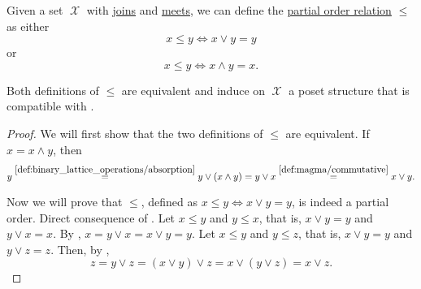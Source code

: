\begin{proposition}\label{thm:binary_lattice_operations_poset}
  Given a set \( \mscrX \) with \hyperref[def:binary_lattice_operations/join]{joins} and \hyperref[def:binary_lattice_operations/meet]{meets}, we can define the \hyperref[def:poset]{partial order relation} \( \leq \) as either
  \begin{equation*}
    x \leq y \iff x \vee y = y
  \end{equation*}
  or
  \begin{equation*}
    x \leq y \iff x \wedge y = x.
  \end{equation*}

  Both definitions of \( \leq \) are equivalent and induce on \( \mscrX \) a poset structure that is compatible with .
\end{proposition}
\begin{proof}
  We will first show that the two definitions of \( \leq \) are equivalent. If \( x = x \wedge y \), then
  \begin{equation*}
    y
    \overset {\ref{def:binary_lattice_operations/absorption}} =
    y \vee (x \wedge y)
    =
    y \vee x
    \overset {\ref{def:magma/commutative}} =
    x \vee y.
  \end{equation*}

  Now we will prove that \( \leq \), defined as \( x \leq y \iff x \vee y = y \), is indeed a partial order.
   Direct consequence of .
   Let \( x \leq y \) and \( y \leq x \), that is, \( x \vee y = y \) and \( y \vee x = x \). By , \( x = y \vee x = x \vee y = y \).
   Let \( x \leq y \) and \( y \leq z \), that is, \( x \vee y = y \) and \( y \vee z = z \). Then, by ,
  \begin{equation*}
    z = y \vee z = (x \vee y) \vee z = x \vee (y \vee z) = x \vee z.
  \end{equation*}
\end{proof}

